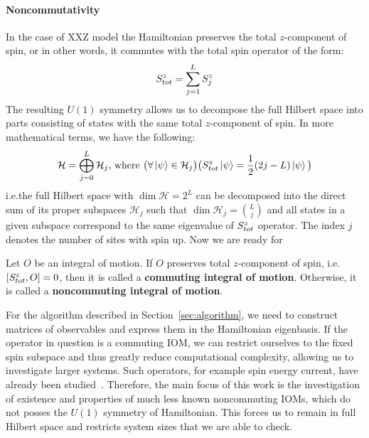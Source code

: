 \paragraph{Noncommutativity}In the case of XXZ model the Hamiltonian preserves the total \(z\)-component of spin,
or in other words, it commutes with the total spin operator of the form:
\begin{equation}
  S^{z}_{tot} = \sum_{j = 1}^{L} S^{z}_j
  \label{eq:magnetization}
\end{equation}
The resulting \(U(1)\) symmetry allows us to decompose the full Hilbert space into parts consisting of states with the same total \(z\)-component
of spin. In more mathematical terms, we have the following:
\begin{equation*}
  \mathcal{H} = \bigoplus_{j = 0}^{L} \mathcal{H}_j \text{, where } \big(\forall \ket{\psi} \in \mathcal{H}_j \big) \big(S^{z}_{tot} \ket{\psi} = \frac{1}{2}(2j-L) \ket{\psi} \big)
\end{equation*}
i.e.\;the full Hilbert space with \(\dim{\mathcal{H}} = 2^L\) can be decomposed into the direct sum of its proper subspaces
\(\mathcal{H}_j\) such that \(\dim{\mathcal{H}_j} = \binom{L}{j}\) and all states in a given subspace correspond to the same
eigenvalue of \(S^{z}_{tot}\) operator. The index \(j\) denotes the number of sites with spin up.
Now we are ready for
\begin{definition}
  Let \(O\) be an integral of motion. If \(O\) preserves total \(z\)-component of spin, i.e.
  \(\comm{\Sz_{tot}}{O} = 0\), then it is called a \textbf{commuting integral of motion}.
  Otherwise, it is called a \textbf{noncommuting integral of motion}.\label{def:noncomm def}
\end{definition}
For the algorithm described in Section~\ref{sec:algorithm}, we need to construct matrices of
observables and express them in the Hamiltonian eigenbasis. If the operator in question is a
commuting IOM, we can restrict ourselves to the fixed spin subspace and thus greatly reduce
computational complexity, allowing us to investigate larger systems. Such operators, for example
spin energy current, have already been studied~\autocite{Mierzejewski2015Approx}. Therefore,
the main focus of this work is the investigation of existence and properties of much less known
noncommuting IOMs, which do not posses the \(U(1)\) symmetry of Hamiltonian. 
This forces us to remain in full Hilbert space and restricts system sizes that we are able to check.


